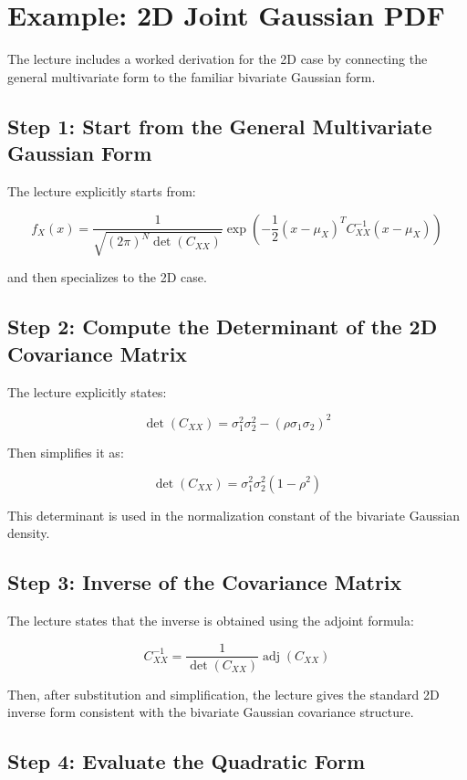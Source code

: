 \documentclass[12pt]{article}
\begin{document}
\section{Example: 2D Joint Gaussian PDF}

The lecture includes a worked derivation for the 2D case by connecting the general multivariate form to the familiar bivariate Gaussian form.

\subsection{Step 1: Start from the General Multivariate Gaussian Form}

The lecture explicitly starts from:

\[
f_X(x) =
\frac{1}{\sqrt{(2\pi)^N \det(C_{XX})}}
\exp\left(
-\frac{1}{2}(x-\mu_X)^T C_{XX}^{-1}(x-\mu_X)
\right)
\]

and then specializes to the 2D case.

\subsection{Step 2: Compute the Determinant of the 2D Covariance Matrix}

The lecture explicitly states:

\[
\det(C_{XX}) = \sigma_1^2 \sigma_2^2 - (\rho \sigma_1 \sigma_2)^2
\]

Then simplifies it as:

\[
\det(C_{XX}) = \sigma_1^2 \sigma_2^2 (1 - \rho^2)
\]

This determinant is used in the normalization constant of the bivariate Gaussian density.

\subsection{Step 3: Inverse of the Covariance Matrix}

The lecture states that the inverse is obtained using the adjoint formula:

\[
C_{XX}^{-1} = \frac{1}{\det(C_{XX})}\operatorname{adj}(C_{XX})
\]

Then, after substitution and simplification, the lecture gives the standard 2D inverse form consistent with the bivariate Gaussian covariance structure.

\subsection{Step 4: Evaluate the Quadratic Form}
\end{document}
